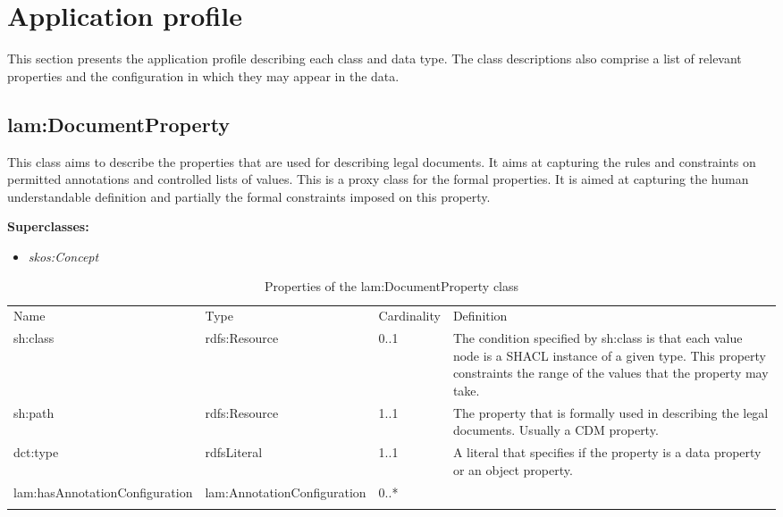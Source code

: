 \section{Application profile}\label{ariaid-title11}

This section presents the application profile describing each class and data type. 
The class descriptions also comprise a list of relevant properties and the configuration in which they may appear in the data.

\subsection{lam:DocumentProperty}

This class aims to describe the properties that are used for describing legal documents. It aims at capturing the rules and constraints on permitted annotations and controlled lists of values.
This is a proxy class for the formal properties. It is aimed at capturing the human understandable definition and partially the formal constraints imposed on this property.

\textbf{Superclasses:}

\begin{itemize}
\itemsep1pt\parskip0pt
\item
  \emph{skos:Concept}
\end{itemize}

{
	\footnotesize
	\selectfont%
	\begin{longtable}[c]{@{}p{3cm}p{3cm}p{2cm}p{5.8cm}@{}}
		\toprule\addlinespace
		Name & Type & Cardinality & Definition
		\\\addlinespace
		\midrule\endhead
		sh:class & rdfs:Resource & 0..1 & The condition specified by sh:class is
		that each value node is a SHACL instance of a given type. This property
		constraints the range of the values that the property may take.
		\\\addlinespace
		sh:path & rdfs:Resource & 1..1 & The property that is formally used in
		describing the legal documents. Usually a CDM property.
		\\\addlinespace
		dct:type & rdfsLiteral & 1..1 & A literal that specifies if the property is a data property or an object property.
		\\\addlinespace
		lam:hasAnnotationConfiguration & 
		lam:AnnotationConfiguration & 0..* & 
		\\\addlinespace
		\bottomrule
		\addlinespace
		\caption{Properties of the lam:DocumentProperty class}
	\end{longtable}
}

